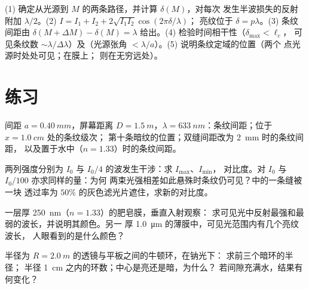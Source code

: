 \begin{method}[求解干涉问题]\label{met:b2:two-wave-interference:method}
(1) 确定从光源到 $M$ 的两条路径，并计算
 $\delta(M)$，对每次
发生半波损失的反射附加 $\lambda/2$。(2) $I = I_1 + I_2 + 2\sqrt{I_1I_2}\cos(2\pi\delta/\lambda)$；
亮纹位于 $\delta = p\lambda$。(3) 条纹间距由 $\delta(M + \Delta M) - \delta(M) =
\lambda$ 给出。(4) 检验时间相干性（$\delta_{\max} < \ell_c$，
可见条纹数 $\sim\lambda/\Delta\lambda$）及（光源张角
$< \lambda/a$）。(5) 说明条纹定域的位置（两个
点光源时处处可见；在膜上；
则在无穷远处）。
\end{method}

\section{练习}

\begin{exercise}[$\star$]\label{exo:b2:two-wave-interference:1}
间距 $a = \qty{0.40}{mm}$，屏幕距离 $D = \qty{1.5}{m}$，$\lambda =
\qty{633}{nm}$：条纹间距；位于 $x = \qty{1.0}{cm}$ 处的条纹级次；
第十条暗纹的位置；双缝间距改为 \qty{2}{mm} 时的条纹间距，
以及置于水中（$n = 1.33$）时的条纹间距。
\end{exercise}

\begin{exercise}[$\star$]\label{exo:b2:two-wave-interference:2}
两列强度分别为 $I_0$ 与 $I_0/4$ 的波发生干涉：求 $I_{\max}$、$I_{\min}$，
对比度。对 $I_0$ 与 $I_0/100$ 亦求同样的量：为何
两束光强相差如此悬殊时条纹仍可见？中的一条缝被一块
透过率为 $50\%$ 的灰色滤光片遮住，求新的对比度。
\end{exercise}

\begin{exercise}[$\star$]\label{exo:b2:two-wave-interference:3}
一层厚 \qty{250}{nm}（$n = 1.33$）的肥皂膜，垂直入射观察：
求可见光中反射最强和最弱的波长，并说明其颜色。另一
厚 \qty{1.0}{\micro m} 的薄膜中，可见光范围内有几个亮纹波长，
人眼看到的是什么颜色？
\end{exercise}

\begin{exercise}[$\star$]\label{exo:b2:two-wave-interference:4}
半径为 $R = \qty{2.0}{m}$ 的透镜与平板之间的牛顿环，在钠光下：
求前三个暗环的半径；
半径 \qty{1}{cm} 之内的环数；中心是亮还是暗，为什么？
若间隙充满水，结果有何变化？
\end{exercise}

